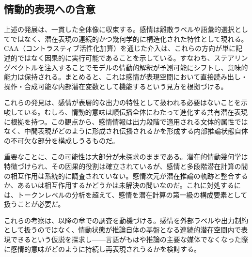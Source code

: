 \subsection{情動的表現への含意}

上述の発展は、一貫した全体像に収束する。感情は離散ラベルや語彙的選択としてではなく、潜在表現の連続的かつ幾何学的に構造化された特性として現れる。CAA（コントラスティブ活性化加算）を通じた介入は、これらの方向が単に記述的ではなく因果的に実行可能であることを示している。すなわち、ステアリングベクトルを注入することでモデルの情動的解釈が予測可能にシフトし、意味的能力は保持される。まとめると、これは感情が表現空間において直接読み出し・操作・合成可能な内部潜在変数として機能するという見方を根拠づける。

これらの発見は、感情が表層的な出力の特性として扱われる必要はないことを示唆している。むしろ、情動的意味は順伝播全体にわたって進化する共有潜在表現に根拠を持つ。この観点から、感情情報は出力段階で適用される文体的属性ではなく、中間表現がどのように形成され伝播されるかを形成する内部推論状態自体の不可欠な部分を構成しうるものだ。

重要なことに、この可能性は大部分が未探求のままである。潜在的情動幾何学は特徴づけられ、その因果的役割は確立されているが、感情と多段階潜在計算の間の相互作用は系統的に調査されていない。感情次元が潜在推論の軌跡と整合するか、あるいは相互作用するかどうかは未解決の問いなのだ。これに対処するには、トークンレベルの分析を超えて、感情を潜在計算の第一級の構成要素として扱うことが必要だ。

これらの考察は、以降の章での調査を動機づける。感情を外部ラベルや出力制約として扱うのではなく、情動状態が推論自体の基盤となる連続的潜在空間内で表現できるという仮説を探求し——言語がもはや推論の主要な媒体でなくなった際に感情的意味がどのように持続し再表現されうるかを検討する。

